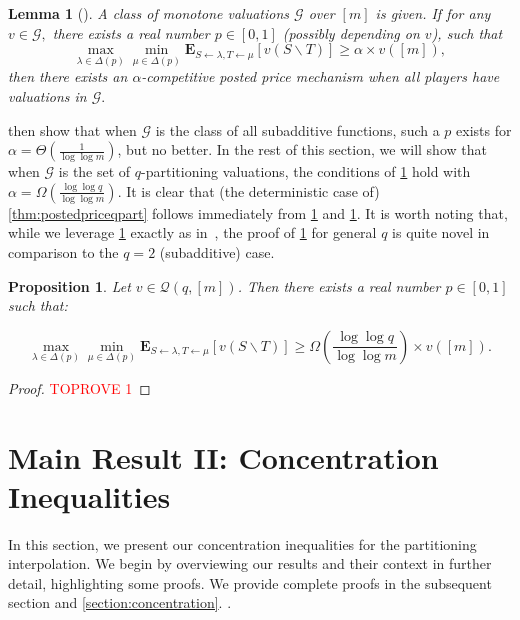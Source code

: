 \documentclass[11pt]{article}\usepackage{amsfonts}
\newtheorem{lemma}[theorem]{Lemma}
\newtheorem{proposition}[theorem]{Proposition}
\numberwithin{theorem}{subsection}
\newcommand{\expect}{\mathbf{E}}
\begin{document}
\begin{lemma}[{\cite[Eq. (6)]{DuttingKL20}}]
\label{lem:minimaxgame}
A class of monotone valuations $\mathcal{G}$ over $[m]$ is given. If for any $v\in \mathcal{G},$ there exists a real number $p \in [0,1]$ (possibly depending on $v$), such that 
$$
\max_{\lambda\in \Delta(p)}
\min_{\mu \in \Delta(p)}\expect_{S\leftarrow \lambda, T\leftarrow \mu}[v(S\backslash T)]\ge 
\alpha \times v([m]),
$$
then there exists an $\alpha$-competitive posted price mechanism when all players have valuations in $\mathcal{G}.$
\end{lemma}

\cite{DuttingKL20} then show that when $\mathcal{G}$ is the class of all subadditive functions, such a $p$ exists for \linebreak $\alpha = \Theta(\frac{1}{\log \log m})$, but no better. In the rest of this section, we will show that when $\mathcal{G}$ is the set of $q$-partitioning valuations, the conditions of 
\cref{lem:minimaxgame} hold with $\alpha = \Omega \left(\frac{\log \log q}{\log \log m}\right)$. It is clear that (the deterministic case of) \cref{thm:postedpriceqpart} follows immediately from \cref{lem:minimaxgame} and \cref{prop:qpartprobexists}. It is worth noting that, while we leverage \cref{lem:minimaxgame} exactly as in~\cite{DuttingKL20}, the proof of \cref{prop:qpartprobexists} for general $q$ is quite novel in comparison to the $q=2$ (subadditive) case.

\begin{proposition}\label{prop:qpartprobexists} Let $v \in \mathcal{Q}(q,[m])$. Then there exists a real number $p\in [0,1]$ such that:

$$\max_{\lambda\in \Delta(p)}
\min_{\mu \in \Delta(p)}\expect_{S\leftarrow \lambda, T\leftarrow \mu}[v(S\backslash T)]\ge
\Omega \left(\frac{\log \log q}{\log \log m}\right)\times v([m]).$$
\end{proposition}

\begin{proof}\textcolor{red}{TOPROVE 1}\end{proof}

\section{Main Result II: Concentration Inequalities}
\label{section:introconcentration}

In this section, we present our concentration inequalities for the partitioning interpolation. We begin by overviewing our results and their context in further detail, highlighting some proofs. We provide complete proofs in the subsequent section and 
\cref{section:concentration}.
.
\end{document}
